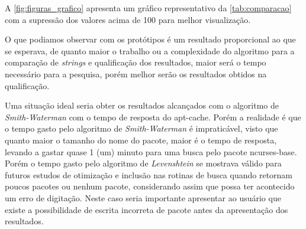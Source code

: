 A \autoref{fig:figuras_grafico} apresenta um gráfico representativo da \autoref{tab:comparacao} com a supressão dos valores acima de 100  para melhor visualização.

O que podiamos observar com os protótipos é um resultado proporcional ao que se esperava, de quanto maior o trabalho ou a complexidade do algoritmo para a comparação de \textit{strings} e qualificação dos resultados, maior será o tempo necessário para a pesquisa, porém melhor serão os resultados obtidos na qualificação.


Uma situação ideal seria obter os resultados alcançados com o algoritmo de \textit{Smith-Waterman} com o tempo de resposta do {\code apt-cache}. Porém a realidade é que o tempo gasto pelo algoritmo de \textit{Smith-Waterman} é impraticável, visto que quanto maior o tamanho do nome do pacote, maior é o tempo de resposta, levando a gastar quase 1 (um) minuto para uma busca pelo pacote {\code ncurses-base}. 
Porém o tempo gasto pelo algoritmo de \textit{Levenshtein} se mostrava válido para futuros estudos de otimização e inclusão nas rotinas de busca quando retornam poucos pacotes ou nenhum pacote, considerando assim que possa ter acontecido um erro de digitação. Neste caso seria importante apresentar ao usuário que existe a possibilidade de escrita incorreta de pacote antes da apresentação dos resultados.


